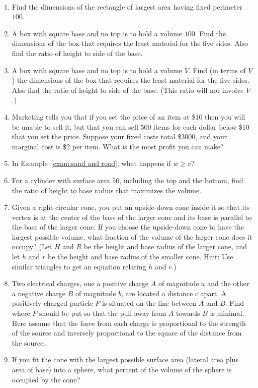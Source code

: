\begin{exercise}~\\
    \begin{enumerate} 
        \item Find the dimensions of the rectangle of largest area having fixed perimeter $100$. \cite{mooc}
        \item A box with square base and no top is to hold a volume $100$.  Find the dimensions of the box that requires the least material for the five sides.  Also find the ratio of height to side of the base. \cite{mooc}
        \item A box with square base and no top is to hold a volume $V$.  Find (in terms of $V$) the dimensions of the box that requires the least material for the five sides.  Also find the ratio of height to side of the base.  (This ratio will not involve $V$.) \cite{mooc}
        \item Marketing tells you that if you set the price of an item at \$10 then you will be unable to sell it, but that you can sell 500 items for each dollar below \$10 that you set the price.  Suppose your fixed costs total \$3000, and your marginal cost is \$2 per item.  What is the most profit you can make? \cite{mooc}
        \item In Example~\ref{exam:sand and road}, what happens if $w\ge v$? \cite{mooc}
        \item For a cylinder with surface area $50$, including the top and the bottom, find the ratio of height to base radius that maximizes the volume. \cite{mooc}
        \item Given a right circular cone, you put an upside-down cone inside it so that its vertex is at the center of the base of the larger cone and its base is parallel to the base of the larger cone.  If you choose the upside-down cone to have the largest possible volume, what fraction of the volume of the larger cone does it occupy?  (Let $H$ and $R$ be the height and base radius of the larger cone, and let $h$ and $r$ be the height and base radius of the smaller cone. Hint: Use similar triangles to get an equation relating $h$ and $r$.) \cite{mooc}
        \item Two electrical charges, one a positive charge $A$ of magnitude $a$ and the other a negative charge $B$ of magnitude $b$, are located a distance $c$ apart.  A positively charged particle $P$ is situated on the line between $A$ and $B$.  Find where $P$ should be put so that the pull away from $A$ towards $B$ is minimal.  Here assume that the force from each charge is proportional to the strength of the source and inversely proportional to the square of the distance from the source. \cite{mooc}
        \item If you fit the cone with the largest possible surface area (lateral area plus area of base) into a sphere, what percent of the volume of the sphere is occupied by the cone? \cite{mooc}
    \end{enumerate}
\end{exercise}
\clearpage

